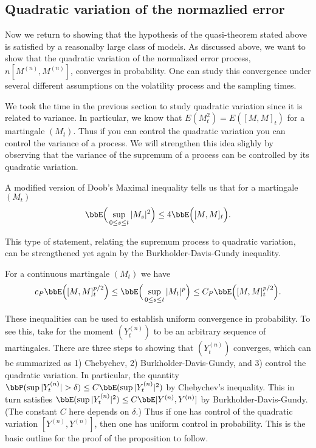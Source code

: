 \documentclass{report}
\begin{document}
\subsection{Quadratic variation of the normazlied error}

Now we return to showing that the hypothesis of the quasi-theorem
stated above is satisfied by a reasonalby large class of models.  As
discussed above, we want to show that the quadratic variation of the
normalized error process, $n [ M^{(n)}, M^{(n)}]$, converges in
probability.  One can study this convergence under several different
assumptions on the volatility process and the sampling times.

We took the time in the previous section to study quadratic variation
since it is related to variance.  In particular, we know that
$E(M_t^2) = E([M,M]_t)$ for a martingale $(M_t)$.  Thus if you can
control the quadratic variation you can control the variance of a
process.  We will strengthen this idea slighly by observing that the
variance of the supremum of a process can be controlled by its
quadratic variation.  

\begin{theorem}
A modified version of Doob's Maximal inequality tells us that for a
martingale $(M_t)$
\[
\bbE \Big( \sup_{0 \leq s \leq t} |M_s|^2 \Big) \leq 4 \bbE \Big(
[M,M]_t \Big).
\]
\end{theorem}

This type of statement, relating the supremum process to quadratic
variation, can be strengthened yet again by the Burkholder-Davis-Gundy
inequality.  

\begin{theorem}
For a continuous martingale $(M_t)$ we have
\[
c_P \bbE \Big( [M,M]_t^{p/2} \Big) 
\leq \bbE \Big( \sup_{0 \leq s \leq t} |M_t|^p \Big)
\leq C_P \bbE \Big( [M,M]_t^{p/2} \Big).
\]
\end{theorem}

These inequalities can be used to establish uniform convergence in
probability.   To see this, take for the moment $(Y^{(n)}_t)$ to be an
arbitrary sequence of martingales.  There are three steps to showing
that $(Y^{(n)}_t)$ converges, which can be summarized as 1) Chebychev,
2) Burkholder-Davis-Gundy, and 3) control the quadratic variation.  
In particular, the quantity $\bbP( \sup |Y^{(n)}_t| > \delta) \leq C
\bbE( \sup |Y^{(n)}_t|^2)$ by Chebychev's inequality.  This in turn
satisfies $\bbE( \sup |Y^{(n)}_t|^2) \leq C \bbE[Y^{(n)},Y^{(n)}]$ by
Burkholder-Davis-Gundy.  (The constant $C$ here depends on $\delta$.) 
Thus if one has control of the quadratic variation
$[Y^{(n)},Y^{(n)}]$, then one has uniform control in probability. 
This is the basic outline for the proof of the proposition to follow.
\end{document}
